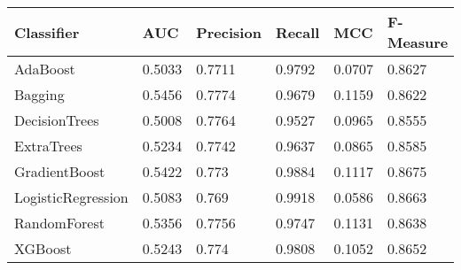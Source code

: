 \begin{tabular}{|p{3cm}p{1.2cm}p{1.2cm}p{1.2cm}p{1.2cm}p{1.5cm}|}
  \hline
Classifier & AUC & Precision & Recall & MCC & F-Measure \\ 
  \hline \hline
AdaBoost & 0.5033 & 0.7711 & 0.9792 & 0.0707 & 0.8627 \\ 
  Bagging & 0.5456 & 0.7774 & 0.9679 & 0.1159 & 0.8622 \\ 
  DecisionTrees & 0.5008 & 0.7764 & 0.9527 & 0.0965 & 0.8555 \\ 
  ExtraTrees & 0.5234 & 0.7742 & 0.9637 & 0.0865 & 0.8585 \\ 
  GradientBoost & 0.5422 & 0.773 & 0.9884 & 0.1117 & 0.8675 \\ 
  LogisticRegression & 0.5083 & 0.769 & 0.9918 & 0.0586 & 0.8663 \\ 
  RandomForest & 0.5356 & 0.7756 & 0.9747 & 0.1131 & 0.8638 \\ 
  XGBoost & 0.5243 & 0.774 & 0.9808 & 0.1052 & 0.8652 \\ 
   \hline
\end{tabular}
